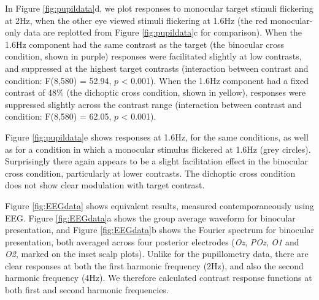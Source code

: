 \documentclass[
]{article}
\begin{document}
In Figure \ref{fig:pupildata}d, we plot responses to monocular target stimuli flickering at 2Hz, when the other eye viewed stimuli flickering at 1.6Hz (the red monocular-only data are replotted from Figure \ref{fig:pupildata}c for comparison). When the 1.6Hz component had the same contrast as the target (the binocular cross condition, shown in purple) responses were facilitated slightly at low contrasts, and suppressed at the highest target contrasts (interaction between contrast and condition: F(8,580) = 52.94, \(p\) \textless{} 0.001). When the 1.6Hz component had a fixed contrast of 48\% (the dichoptic cross condition, shown in yellow), responses were suppressed slightly across the contrast range (interaction between contrast and condition: F(8,580) = 62.05, \(p\) \textless{} 0.001).

Figure \ref{fig:pupildata}e shows responses at 1.6Hz, for the same conditions, as well as for a condition in which a monocular stimulus flickered at 1.6Hz (grey circles). Surprisingly there again appears to be a slight facilitation effect in the binocular cross condition, particularly at lower contrasts. The dichoptic cross condition does not show clear modulation with target contrast.

Figure \ref{fig:EEGdata} shows equivalent results, measured contemporaneously using EEG. Figure \ref{fig:EEGdata}a shows the group average waveform for binocular presentation, and Figure \ref{fig:EEGdata}b shows the Fourier spectrum for binocular presentation, both averaged across four posterior electrodes (\emph{Oz}, \emph{POz}, \emph{O1} and \emph{O2}, marked on the inset scalp plots). Unlike for the pupillometry data, there are clear responses at both the first harmonic frequency (2Hz), and also the second harmonic frequency (4Hz). We therefore calculated contrast response functions at both first and second harmonic frequencies.
\end{document}
